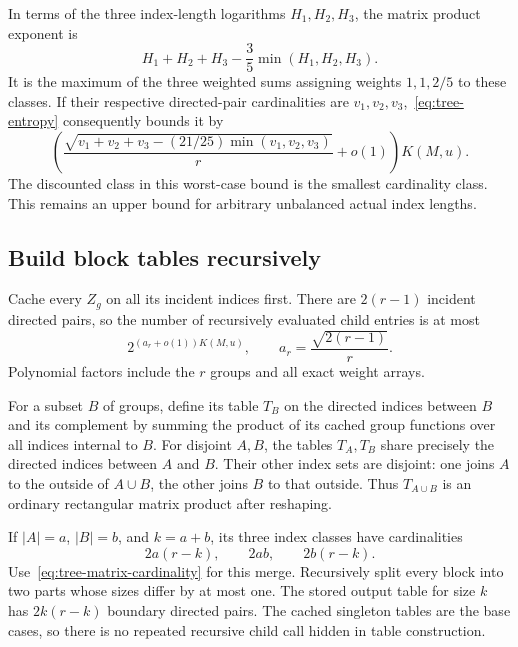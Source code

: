 In terms of the three index-length logarithms $H_1,H_2,H_3$, the matrix product exponent is
\begin{equation}\label{eq:tree-rectangular}
 H_1+H_2+H_3-\frac35\min(H_1,H_2,H_3).
\end{equation}
It is the maximum of the three weighted sums assigning weights $1,1,2/5$ to these classes. If their respective directed-pair cardinalities are $v_1,v_2,v_3$,~\eqref{eq:tree-entropy} consequently bounds it by
\begin{equation}\label{eq:tree-matrix-cardinality}
 \left(\frac{\sqrt{v_1+v_2+v_3-(21/25)\min(v_1,v_2,v_3)}}r+o(1)\right)K(M,u).
\end{equation}
The discounted class in this worst-case bound is the smallest cardinality class. This remains an upper bound for arbitrary unbalanced actual index lengths.

\subsection{Build block tables recursively}
Cache every $Z_g$ on all its incident indices first. There are $2(r-1)$ incident directed pairs, so the number of recursively evaluated child entries is at most
\[
 2^{(a_r+o(1))K(M,u)},\qquad a_r=\frac{\sqrt{2(r-1)}}r.
\]
Polynomial factors include the $r$ groups and all exact weight arrays.

For a subset $B$ of groups, define its table $T_B$ on the directed indices between $B$ and its complement by summing the product of its cached group functions over all indices internal to $B$. For disjoint $A,B$, the tables $T_A,T_B$ share precisely the directed indices between $A$ and $B$. Their other index sets are disjoint: one joins $A$ to the outside of $A\cup B$, the other joins $B$ to that outside. Thus $T_{A\cup B}$ is an ordinary rectangular matrix product after reshaping.

If $|A|=a$, $|B|=b$, and $k=a+b$, its three index classes have cardinalities
\begin{equation}\label{eq:tree-merge-classes}
 2a(r-k),\qquad 2ab,\qquad 2b(r-k).
\end{equation}
Use~\eqref{eq:tree-matrix-cardinality} for this merge. Recursively split every block into two parts whose sizes differ by at most one. The stored output table for size $k$ has $2k(r-k)$ boundary directed pairs. The cached singleton tables are the base cases, so there is no repeated recursive child call hidden in table construction.

